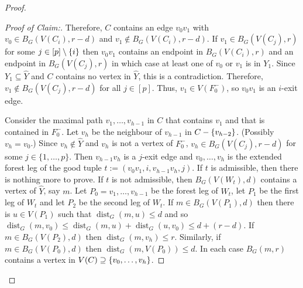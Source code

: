 \documentclass{patmorin}
\newenvironment{clmproof}{\begin{proof}[Proof of Claim:]\renewcommand{\qedsymbol}{\rule{1ex}{1ex}}}{\end{proof}}
\DeclareMathOperator{\dist}{dist}
\DeclarePairedDelimiter\set{\{}{\}}
\begin{document}
\begin{proof}
\begin{clmproof}
  Therefore, $C$ contains an edge $v_0v_1$ with $v_0\in B_G(V(C_i),r-d)$ and $v_1\not\in B_G(V(C_i),r-d)$.
  If $v_1\in B_G(V(C_j),r)$ for some $j\in[p]\setminus\set{i}$ then $v_0v_1$ contains an endpoint in $B_G(V(C_i),r)$ and an endpoint in $B_G(V(C_j),r)$ in which case at least one of $v_0$ or $v_1$ is in $Y_1$. Since $Y_1\subseteq \widehat{Y}$ and $C$ contains no vertex in $\widehat{Y}$, this is a contradiction.
  Therefore, $v_1\not\in B_G(V(C_j),r-d)$ for all $j\in[p]$.
  Thus, $v_1\in V(F^-_0)$, so $v_0v_1$ is an $i$-exit edge.

  Consider the maximal path $v_1,\ldots,v_{h-1}$ in $C$ that contains $v_1$ and that is contained in $F_0^-$. Let $v_h$ be the neighbour of $v_{h-1}$ in $C-\set{v_{h-2}}$.  (Possibly $v_h=v_0$.)  Since $v_h\notin \widehat{Y}$ and $v_h$ is not a vertex of $F_0^-$, $v_h\in B_G(V(C_j),r-d)$ for some $j\in\{1,\ldots,p\}$.   Then $v_{h-1}v_h$ is a $j$-exit edge and $v_0,\ldots,v_{h}$ is the extended forest leg of the good tuple $t:=(v_0v_1,i,v_{h-1}v_h,j)$.   If $t$ is admissible, then there is nothing more to prove.  If $t$ is not admissible,
  then $B_G(V(W_t),d)$ contains a vertex of $\widehat{Y}$, say $m$.
  Let $P_0=v_1,\ldots,v_{h-1}$ be the forest leg of $W_t$, let $P_1$ be the first leg of $W_t$ and let $P_2$ be the second leg of $W_t$.
  If $m\in B_G(V(P_1),d)$ then there is $u\in V(P_1)$ such that $\dist_G(m,u)\leq d$ and so
  $\dist_G(m,v_0)\le \dist_G(m,u) + \dist_G(u,v_0)\le d + (r-d)$.
  If $m\in B_G(V(P_2),d)$ then $\dist_G(m,v_h)\le r$.  Similarly, if $m\in B_G(V(P_0),d)$ then $\dist_G(m,V(P_0))\le d$.  In each case $B_G(m,r)$ contains a vertex in $V(C)\supseteq \set{v_0,\ldots,v_h}$.
\end{clmproof}



\end{proof}
\end{document}
